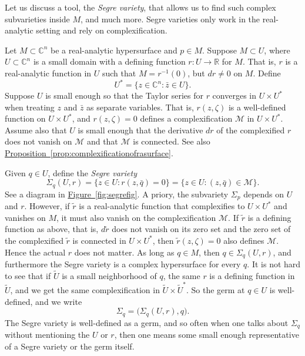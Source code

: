 \documentclass[12pt,openany]{book}
\newcommand{\C}{{\mathbb{C}}}
\newcommand{\R}{{\mathbb{R}}}
\newcommand{\sM}{{\mathscr{M}}}
\newcommand{\myindex}[1]{#1\index{#1}}
\theoremstyle{plain}
\theoremstyle{remark}
\theoremstyle{definition}
\theoremstyle{exercise}
\theoremstyle{example}
\newcommand{\figureref}[1]{\hyperref[#1]{Figure~\ref*{#1}}}
\newcommand{\propref}[1]{\hyperref[#1]{Proposition~\ref*{#1}}}
\begin{document}
Let us discuss a tool, the \emph{\myindex{Segre variety}}, that allows us to
find such complex subvarieties inside $M$, and much more.  Segre varieties only
work in the real-analytic setting and rely on complexification.

Let $M \subset \C^n$ be a real-analytic hypersurface and $p \in M$.
Suppose $M \subset U$,
where $U \subset \C^n$ is a small domain with a defining function $r \colon
U  \to \R$ for $M$.  That is, $r$ is a real-analytic function in $U$ such that
$M = r^{-1}(0)$, but
$dr \not= 0$ on $M$.  Define
%
\begin{equation*}
U^* = \bigl\{ z \in \C^n : \bar{z} \in U \bigr\} .
\end{equation*}
Suppose $U$ is small enough so that the Taylor series for $r$
converges in $U \times U^*$ when treating $z$ and $\bar{z}$ as separate
variables.  That is, $r(z,\zeta)$ is a well-defined function on
$U \times U^*$, and $r(z,\zeta) = 0$ defines a complexification $\sM$
in $U \times U^*$.  Assume also that $U$ is small enough that
the derivative $dr$ of the complexified $r$ does not vanish on
$\sM$ and that $\sM$ is connected.
See also \propref{prop:complexificationofrasurface}.

Given $q \in U$,
define the \emph{Segre variety}
%
\begin{equation*}
\Sigma_q(U,r) =
\bigl\{ z \in U : r(z,\bar{q}) = 0 \bigr\} =
\bigl\{ z \in U : (z,\bar{q}) \in \sM \bigr\} .
\end{equation*}
See a diagram in \figureref{fig:segrefig}.
A priory, the subvariety $\Sigma_p$ depends on $U$ and $r$.
However, if $\widetilde{r}$ is a
real-analytic function that complexifies to $U \times U^*$
and vanishes on $M$, it must also vanish on the complexification $\sM$.
If $\widetilde{r}$ is a defining function as above,
that is, $d\widetilde{r}$ does not vanish on its zero set
and the zero set of the complexified $\widetilde{r}$ is connected
in $U \times U^*$, then $\widetilde{r}(z,\zeta) = 0$ also
defines $\sM$.
Hence the actual $r$ does not matter.
As long as $q \in M$, then
$q \in \Sigma_q(U,r)$, and furthermore the
Segre variety is a complex hypersurface for every $q$.
It is not hard to see that
if $\widetilde{U}$ is a small neighborhood of $q$, the same $r$ is
a defining function in
$\widetilde{U}$, and we
get the same complexification in $\widetilde{U} \times \widetilde{U}^*$.
So the germ at $q \in U$ is well-defined, and we write
\begin{equation*}
\Sigma_q = \bigl( \Sigma_q(U,r) , q \bigr) .
\end{equation*}
The Segre variety is
well-defined as a germ, and so often when one talks about $\Sigma_q$
without mentioning the $U$ or $r$, then one means some small enough
representative of a Segre variety or the germ itself.
\end{document}
